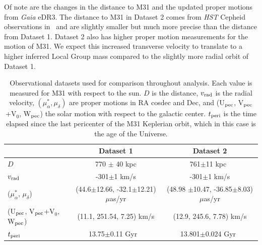 \documentclass[twocolumn]{aastex631}
\begin{document}
Of note are the changes in the distance to M31 and the updated proper motions
from \textit{Gaia} eDR3. 
The distance to M31 in Dataset 2 comes from \textit{HST} Cepheid observations 
in~\cite{Li2021} and are slightly smaller but much more precise than the 
distance from Dataset 1. 
Dataset 2 also has higher proper motion measurements for the motion of M31. 
We expect this increased transverse velocity to translate to a higher inferred 
Local Group mass compared to the slightly more radial orbit of Dataset 1.

\begin{table}
  \centering
  \begin{tabular}{lc|c}
    \hline\hline
                    & Dataset 1                     & Dataset 2 \\\hline
  $D$               &  770 $\pm$ 40 \rm kpc\cite{}     &   761$\pm$11 \rm kpc~\citep{Li2021}        \\
  $v_{\rm rad}$     &     -301$\pm$1 km/s       &   -301$\pm$1 km/s        \\
  ($\mu_\alpha^*$,  $\mu_\delta$)    & (44.6$\pm$12.66, -32.1$\pm$12.21) $\mu$as/yr \citep{} & (48.98 $\pm$10.47, -36.85$\pm$8.03) $\mu$as/yr \citep{Salomon2021}\\
  (U$_{\rm pec}$, V$_{\rm pec}$+V$_0$, W$_{\rm pec}$) & (11.1, 251.54, 7.25) km/s& (12.9, 245.6, 7.78) km/s \citep{Drimmel2018}\\
  $t_{\rm peri}$ & 13.75$\pm$0.11 Gyr ~\citep{Jarosik2011} & 13.801$\pm$0.024 Gyr~\citep{??}\\
  \hline\hline

  \end{tabular}
  \caption{\label{table:data}Observational datasets used for comparison throughout analysis. Each value is measured for M31 with respect to the sun. $D$ is the distance, $v_{\rm rad}$ is the radial velocity, $(\mu^*_{\alpha}, \mu_{\delta})$ are proper motions in RA cosdec and Dec, and (U$_{\rm pec}$, V$_{\rm pec}$+V$_0$, W$_{\rm pec}$) the solar motion with respect to the galactic center. $t_{\rm peri}$ is the time elapsed since the last pericenter of the M31 Keplerian orbit, which in this case is the age of the Universe. }
\end{table}
\end{document}

